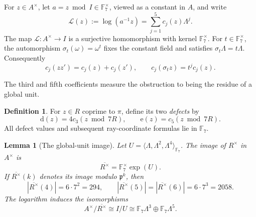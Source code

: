 \documentclass[11pt]{amsart}
\theoremstyle{plain}
\newtheorem{lemma}[theorem]{Lemma}
\theoremstyle{definition}
\newtheorem{definition}[theorem]{Definition}
\numberwithin{equation}{section}
\newcommand{\F}{\mathbb F}
\newcommand{\pp}{\mathfrak p}
\newcommand{\dd}{\mathrm d}
\newcommand{\ee}{\mathrm e}
\begin{document}
For $z\in A^\times$, let $a=z\bmod I\in\F_7^\times$, viewed as a
constant in $A$, and write
\begin{equation}\label{eq:finite-log}
 \mathcal L(z):=\log(a^{-1}z)
       =\sum_{j=1}^{5}c_j(z)\Lambda^j.
\end{equation}
The map $\mathcal L\colon A^\times\to I$ is a surjective homomorphism with
kernel $\F_7^\times$.  For $t\in\F_7^\times$, the automorphism
$\sigma_t(\omega)=\omega^t$ fixes the constant field and satisfies
$\sigma_t\Lambda=t\Lambda$.  Consequently
\begin{equation}\label{eq:log-characters}
 c_j(zz')=c_j(z)+c_j(z'),\qquad
 c_j(\sigma_tz)=t^jc_j(z).
\end{equation}

The third and fifth coefficients measure the obstruction to
being the residue of a global unit.
\begin{definition}\label{def:de}
For $z\in R$ coprime to $\pi$, define its two \emph{defects} by
\begin{equation}\label{eq:log-defects}
 \dd(z)=4c_3(z\bmod7R),\qquad \ee(z)=c_5(z\bmod7R).
\end{equation}
All defect values and subsequent ray-coordinate formulas lie in $\F_7$.
\end{definition}

\begin{lemma}[The global-unit image]\label{lem:unit-images}
Let $U=\langle\Lambda,\Lambda^2,\Lambda^4\rangle_{\F_7}$.  The image of
$R^\times$ in $A^\times$ is
\[
 \overline{R^\times}=\F_7^\times\exp(U).
\]
If $\overline{R^\times}(k)$ denotes its image modulo $\pp^k$, then
\[
 |\overline{R^\times}(4)|=6\cdot7^2=294,\qquad
 |\overline{R^\times}(5)|=|\overline{R^\times}(6)|
       =6\cdot7^3=2058.
\]
The logarithm induces the isomorphisms
\[
 A^\times/\overline{R^\times}
  \cong I/U\cong\F_7\Lambda^3\oplus\F_7\Lambda^5.
\]
\end{lemma}
\end{document}
